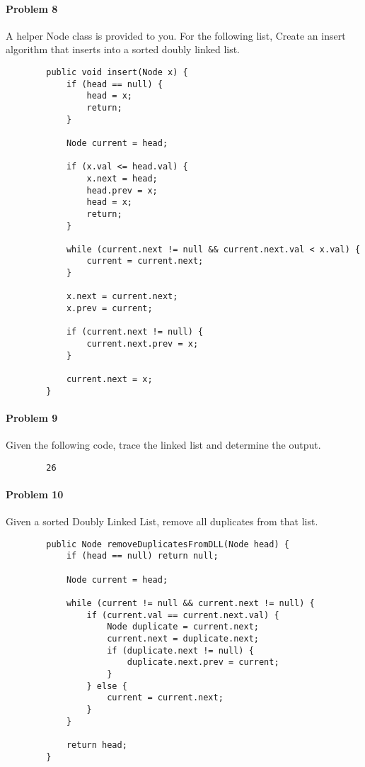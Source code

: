 \documentclass[letterpaper]{article}
\begin{document}
	\paragraph{Problem 8} A helper Node class is provided to you. For the following list, Create an insert algorithm that inserts into a sorted doubly linked list.
	
	\begin{verbatim} 
        public void insert(Node x) {
            if (head == null) {
                head = x;
                return;
            }
            
            Node current = head;
            
            if (x.val <= head.val) {
                x.next = head;
                head.prev = x;
                head = x;
                return;
            }
            
            while (current.next != null && current.next.val < x.val) {
                current = current.next;
            }
            
            x.next = current.next;
            x.prev = current;
            
            if (current.next != null) {
                current.next.prev = x;
            }
            
            current.next = x;
        }
	\end{verbatim}  
	
	\paragraph{Problem 9} Given the following code, trace the linked list and determine the output.
	
	\begin{verbatim}
		26
	\end{verbatim}
	
	\paragraph{Problem 10} Given a sorted Doubly Linked List, remove all duplicates from that list.
	
	\begin{verbatim}
        public Node removeDuplicatesFromDLL(Node head) {
            if (head == null) return null;
            
            Node current = head;
            
            while (current != null && current.next != null) {
                if (current.val == current.next.val) {
                    Node duplicate = current.next;
                    current.next = duplicate.next;
                    if (duplicate.next != null) {
                        duplicate.next.prev = current;
                    }
                } else {
                    current = current.next; 
                }
            }
            
            return head;
        }
		
	\end{verbatim}
	
\end{document}
